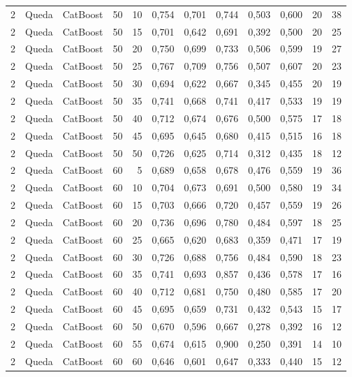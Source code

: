 \begin{longtable}{@{}rllrrrrrrrrr@{}}
2 & Queda & CatBoost & 50 & 10 & 0,754 & 0,701 & 0,744 & 0,503 & 0,600 & 20 & 38 \\
2 & Queda & CatBoost & 50 & 15 & 0,701 & 0,642 & 0,691 & 0,392 & 0,500 & 20 & 25 \\
2 & Queda & CatBoost & 50 & 20 & 0,750 & 0,699 & 0,733 & 0,506 & 0,599 & 19 & 27 \\
2 & Queda & CatBoost & 50 & 25 & 0,767 & 0,709 & 0,756 & 0,507 & 0,607 & 20 & 23 \\
2 & Queda & CatBoost & 50 & 30 & 0,694 & 0,622 & 0,667 & 0,345 & 0,455 & 20 & 19 \\
2 & Queda & CatBoost & 50 & 35 & 0,741 & 0,668 & 0,741 & 0,417 & 0,533 & 19 & 19 \\
2 & Queda & CatBoost & 50 & 40 & 0,712 & 0,674 & 0,676 & 0,500 & 0,575 & 17 & 18 \\
2 & Queda & CatBoost & 50 & 45 & 0,695 & 0,645 & 0,680 & 0,415 & 0,515 & 16 & 18 \\
2 & Queda & CatBoost & 50 & 50 & 0,726 & 0,625 & 0,714 & 0,312 & 0,435 & 18 & 12 \\
2 & Queda & CatBoost & 60 & 5 & 0,689 & 0,658 & 0,678 & 0,476 & 0,559 & 19 & 36 \\
2 & Queda & CatBoost & 60 & 10 & 0,704 & 0,673 & 0,691 & 0,500 & 0,580 & 19 & 34 \\
2 & Queda & CatBoost & 60 & 15 & 0,703 & 0,666 & 0,720 & 0,457 & 0,559 & 19 & 26 \\
2 & Queda & CatBoost & 60 & 20 & 0,736 & 0,696 & 0,780 & 0,484 & 0,597 & 18 & 25 \\
2 & Queda & CatBoost & 60 & 25 & 0,665 & 0,620 & 0,683 & 0,359 & 0,471 & 17 & 19 \\
2 & Queda & CatBoost & 60 & 30 & 0,726 & 0,688 & 0,756 & 0,484 & 0,590 & 18 & 23 \\
2 & Queda & CatBoost & 60 & 35 & 0,741 & 0,693 & 0,857 & 0,436 & 0,578 & 17 & 16 \\
2 & Queda & CatBoost & 60 & 40 & 0,712 & 0,681 & 0,750 & 0,480 & 0,585 & 17 & 20 \\
2 & Queda & CatBoost & 60 & 45 & 0,695 & 0,659 & 0,731 & 0,432 & 0,543 & 15 & 17 \\
2 & Queda & CatBoost & 60 & 50 & 0,670 & 0,596 & 0,667 & 0,278 & 0,392 & 16 & 12 \\
2 & Queda & CatBoost & 60 & 55 & 0,674 & 0,615 & 0,900 & 0,250 & 0,391 & 14 & 10 \\
2 & Queda & CatBoost & 60 & 60 & 0,646 & 0,601 & 0,647 & 0,333 & 0,440 & 15 & 12 \\

\end{longtable}
